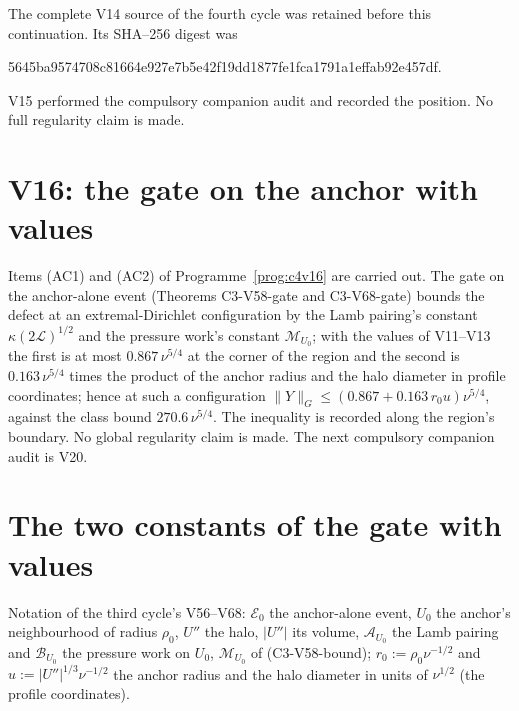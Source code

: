 \documentclass[11pt]{article}
\theoremstyle{plain}
\theoremstyle{definition}
\theoremstyle{remark}
\begin{document}
The complete V14 source of the fourth cycle was retained before this
continuation.  Its SHA--256 digest was
\begin{center}\scriptsize\ttfamily
5645ba9574708c81664e927e7b5e42f19dd1877fe1fca1791a1effab92e457df.
\end{center}
V15 performed the compulsory companion audit and recorded the
position.  No full regularity claim is made.

\section{V16: the gate on the anchor with values}
\label{sec:c4v16-entry}

Items (AC1) and (AC2) of Programme~\ref{prog:c4v16} are carried out.
The gate on the anchor-alone event (Theorems C3-V58-gate and
C3-V68-gate) bounds the defect at an extremal-Dirichlet configuration
by the Lamb pairing's constant \(\kappa(2\mathcal L)^{1/2}\) and the pressure work's
constant \(\mathcal M_{U_0}\); with the values of V11--V13 the first is at most
\(0.867\,\nu^{5/4}\) at the corner of the region and the second is
\(0.163\,\nu^{5/4}\) times the product of the anchor radius and the halo
diameter in profile coordinates; hence at such a configuration
\(\|Y\|_G\le(0.867+0.163\,r_0u)\nu^{5/4}\), against the class bound \(270.6\,\nu^{5/4}\).  The
inequality is recorded along the region's boundary.  No global
regularity claim is made.  The next compulsory companion audit is
V20.

\section{The two constants of the gate with values}
\label{sec:c4v16-constants}

Notation of the third cycle's V56--V68: \(\mathcal E_0\) the anchor-alone event,
\(U_0\) the anchor's neighbourhood of radius \(\rho_0\), \(U''\) the halo, \(|U''|\) its
volume, \(\mathcal A_{U_0}\) the Lamb pairing and \(\mathcal B_{U_0}\) the pressure work on \(U_0\),
\(\mathcal M_{U_0}\) of (C3-V58-bound); \(r_0:=\rho_0\nu^{-1/2}\) and \(u:=|U''|^{1/3}\nu^{-1/2}\) the anchor radius
and the halo diameter in units of \(\nu^{1/2}\) (the profile coordinates).
\end{document}
